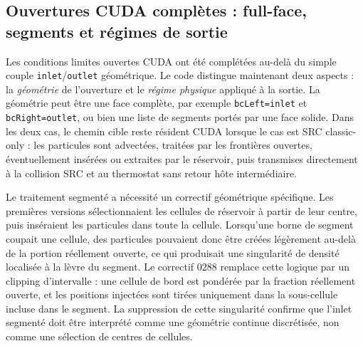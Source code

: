 \documentclass[11pt,a4paper]{article}
\begin{document}
\subsection{Ouvertures CUDA complètes : full-face, segments et régimes de sortie}

Les conditions limites ouvertes CUDA ont été complétées au-delà du simple couple \texttt{inlet}/\texttt{outlet} géométrique. Le code distingue maintenant deux aspects : la \emph{géométrie} de l'ouverture et le \emph{régime physique} appliqué à la sortie. La géométrie peut être une face complète, par exemple \texttt{bcLeft=inlet} et \texttt{bcRight=outlet}, ou bien une liste de segments portés par une face solide. Dans les deux cas, le chemin cible reste résident CUDA lorsque le cas est SRC classic-only : les particules sont advectées, traitées par les frontières ouvertes, éventuellement insérées ou extraites par le réservoir, puis transmises directement à la collision SRC et au thermostat sans retour hôte intermédiaire.

Le traitement segmenté a nécessité un correctif géométrique spécifique. Les premières versions sélectionnaient les cellules de réservoir à partir de leur centre, puis inséraient les particules dans toute la cellule. Lorsqu'une borne de segment coupait une cellule, des particules pouvaient donc être créées légèrement au-delà de la portion réellement ouverte, ce qui produisait une singularité de densité localisée à la lèvre du segment. Le correctif 0288 remplace cette logique par un clipping d'intervalle : une cellule de bord est pondérée par la fraction réellement ouverte, et les positions injectées sont tirées uniquement dans la sous-cellule incluse dans le segment. La suppression de cette singularité confirme que l'inlet segmenté doit être interprété comme une géométrie continue discrétisée, non comme une sélection de centres de cellules.
\end{document}
